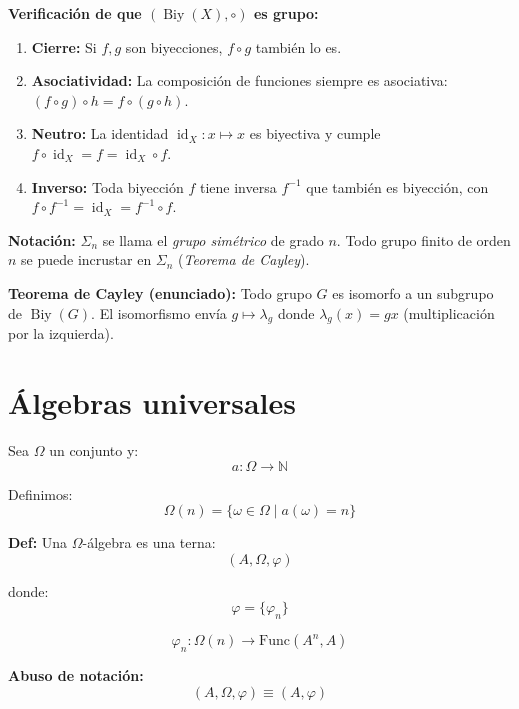 \documentclass[12pt]{article}
\begin{document}
\begin{tcolorbox}[iabox]
\textbf{Verificación de que $(\operatorname{Biy}(X),\circ)$ es grupo:}
\begin{enumerate}
  \item \textbf{Cierre:} Si $f,g$ son biyecciones, $f\circ g$ también lo es.
  \item \textbf{Asociatividad:} La composición de funciones siempre es asociativa: $(f\circ g)\circ h = f\circ(g\circ h)$.
  \item \textbf{Neutro:} La identidad $\operatorname{id}_X:x\mapsto x$ es biyectiva y cumple $f\circ\operatorname{id}_X=f=\operatorname{id}_X\circ f$.
  \item \textbf{Inverso:} Toda biyección $f$ tiene inversa $f^{-1}$ que también es biyección, con $f\circ f^{-1}=\operatorname{id}_X=f^{-1}\circ f$.
\end{enumerate}

\textbf{Notación:} $\Sigma_n$ se llama el \emph{grupo simétrico} de grado $n$. Todo grupo finito de orden $n$ se puede incrustar en $\Sigma_n$ (\emph{Teorema de Cayley}).

\textbf{Teorema de Cayley (enunciado):} Todo grupo $G$ es isomorfo a un subgrupo de $\operatorname{Biy}(G)$. El isomorfismo envía $g\mapsto \lambda_g$ donde $\lambda_g(x)=gx$ (multiplicación por la izquierda).
\end{tcolorbox}

\section*{Álgebras universales}

Sea $\Omega$ un conjunto y:
\[
a:\Omega\to\mathbb{N}
\]

Definimos:
\[
\Omega(n)=\{\omega\in\Omega \mid a(\omega)=n\}
\]

\textbf{Def:} Una $\Omega$-álgebra es una terna:
\[
(A,\Omega,\varphi)
\]

donde:
\[
\varphi=\{\varphi_n\}
\]

\[
\varphi_n:\Omega(n)\to \text{Func}(A^n,A)
\]

\textbf{Abuso de notación:}
\[
(A,\Omega,\varphi)\equiv (A,\varphi)
\]
\end{document}
